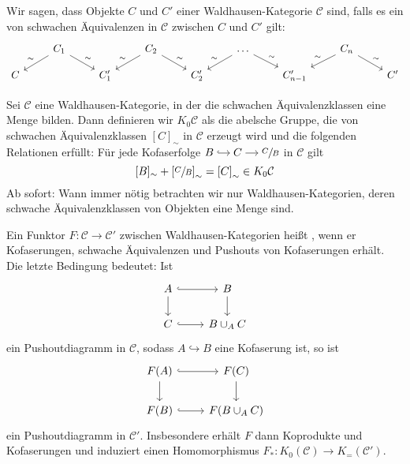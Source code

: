 \begin{definition}[{name=[{schwache Äquivalenz von Objekten einer Waldhausen-Kategorie}]}]
	Wir sagen, dass Objekte $C$ und $C'$ einer Waldhausen-Kategorie $\mathcal{C}$  sind, falls es ein  von schwachen Äquivalenzen in $\mathcal{C}$ zwischen $C$ und $C'$ gilt:
	\[
		\begin{tikzcd}[row sep=small]
			& C_1 \dlar["\sim"'] \drar["\sim"] & & C_2 \dlar["\sim"'] \drar["\sim"] && \ldots \dlar["\sim"'] \drar["\sim"] && C_n \dlar["\sim"'] \drar["\sim"]\\
			C && C_1' && C_2'&& C_{n-1}' && C'
		\end{tikzcd}
	\]
\end{definition}

\begin{definition}[{name=[K-Theorie einer Waldhausen-Kategorie]}]
	Sei $\mathcal{C}$ eine Waldhausen-Kategorie, in der die schwachen Äquivalenzklassen eine Menge bilden.
	Dann definieren wir $K_0 \mathcal{C}$ als die abelsche Gruppe, die von schwachen Äquivalenzklassen $[C]_\sim$ in $\mathcal{C}$ erzeugt wird und die folgenden Relationen erfüllt: 
	Für jede Kofaserfolge $\begin{tikzcd}[cramped,sep=small] B \rar[hook] & C \rar & \sfrac{C}{B} \end{tikzcd}$ in $\mathcal{C}$ gilt
	\[
		[B]_\sim + \benbrace*{\sfrac{C}{B}}_\sim = \benbrace*{C}_\sim \in K_0 \mathcal{C}
	\]
	Ab sofort: Wann immer nötig betrachten wir nur Waldhausen-Kategorien, deren schwache Äquivalenzklassen von Objekten eine Menge sind.
\end{definition}

\begin{bemerkung}
	Ein Funktor $F \colon \mathcal{C} \to \mathcal{C}'$ zwischen Waldhausen-Kategorien heißt , wenn er Kofaserungen, schwache Äquivalenzen und Pushouts von Kofaserungen erhält.
	Die letzte Bedingung bedeutet: Ist 
	\[
		\begin{tikzcd}
			A \rar[hook] \dar & B \dar \\
			C \rar[hook] & B \cup_A C
		\end{tikzcd}
	\] 
	ein Pushoutdiagramm in $\mathcal{C}$, sodass $A \hookrightarrow B$ eine Kofaserung ist, so ist
	\[
		\begin{tikzcd}
			F(A) \rar[hook] \dar & F(C) \dar\\
			F(B) \rar[hook] & F(B \cup_A C)
		\end{tikzcd}
	\]
	ein Pushoutdiagramm in $\mathcal{C}'$.
	Insbesondere erhält $F$ dann Koprodukte und Kofaserungen und induziert einen Homomorphismus $F_* \colon K_0(\mathcal{C}) \to K_=(\mathcal{C}')$.
\end{bemerkung}

